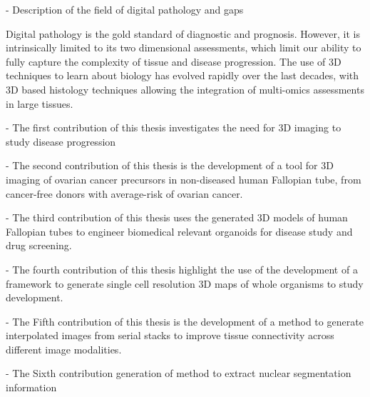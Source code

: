 

-	Description of the field of digital pathology and gaps \

Digital pathology is the gold standard of diagnostic and prognosis. However, it is intrinsically limited to its two dimensional assessments, which limit our ability to fully capture the complexity of tissue and disease progression. The use of 3D techniques to learn about biology has evolved rapidly over the last decades, with 3D based histology techniques allowing the integration of multi-omics assessments in large tissues. \

-	The first contribution of this thesis investigates the need for 3D imaging to study disease progression

- The second contribution of this thesis is the development of a tool for 3D imaging of ovarian cancer precursors in non-diseased human Fallopian tube, from cancer-free donors with average-risk of ovarian cancer. \

-	The third contribution of this thesis uses the generated 3D models of human Fallopian tubes to engineer biomedical relevant organoids for disease study and drug screening. \

-	The fourth contribution of this thesis highlight the use of the development of a framework to generate single cell resolution 3D maps of whole organisms to study development.\

-	The Fifth contribution of this thesis is the development of a method to generate interpolated images from serial stacks to improve tissue connectivity across different image modalities.\

-	The Sixth contribution generation of method to extract nuclear segmentation information \




